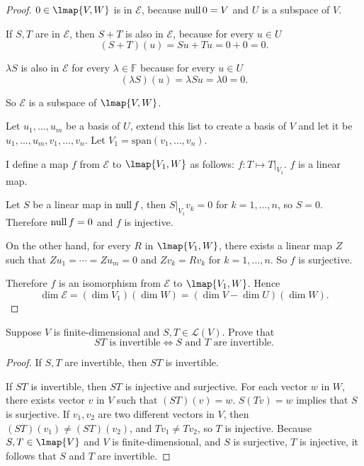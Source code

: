 \begin{proof}
    $0\in \lmap{V, W}$ is in $\mathcal{E}$, because $\text{null}\,{0} = V$ and $U$ is a subspace of $V$.

    If $S, T$ are in $\mathcal{E}$, then $S + T$ is also in $\mathcal{E}$, because for every $u\in U$
    \[
        (S + T)(u) = Su + Tu = 0 + 0 = 0.
    \]

    $\lambda S$ is also in $\mathcal{E}$ for every $\lambda\in\mathbb{F}$ because for every $u\in U$
    \[
        (\lambda S)(u) = \lambda Su = \lambda 0 = 0.
    \]

    So $\mathcal{E}$ is a subspace of $\lmap{V, W}$.

    \bigskip

    Let $u_{1}, \ldots, u_{m}$ be a basis of $U$, extend this list to create a basis of $V$ and let it be $u_{1}, \ldots, u_{m}, v_{1}, \ldots, v_{n}$. Let $V_{1} = \text{span}(v_{1}, \ldots, v_{n})$.

    I define a map $f$ from $\mathcal{E}$ to $\lmap{V_{1}, W}$ as follows: $f: T\mapsto T\vert_{V_{1}}$. $f$ is a linear map.

    Let $S$ be a linear map in $\text{null}\,{f}$, then $S\vert_{V_{1}}v_{k} = 0$ for $k = 1, \ldots, n$, so $S = 0$. Therefore $\text{null}\,{f} = 0$ and $f$ is injective.

    On the other hand, for every $R$ in $\lmap{V_{1}, W}$, there exists a linear map $Z$ such that $Zu_{1} = \cdots = Zu_{m} = 0$ and $Zv_{k} = Rv_{k}$ for $k = 1, \ldots, n$. So $f$ is surjective.

    Therefore $f$ is an isomorphism from $\mathcal{E}$ to $\lmap{V_{1}, W}$. Hence
    \[
        \dim\mathcal{E} = (\dim V_{1})(\dim W) = (\dim V - \dim U)(\dim W).
    \]
\end{proof}
\newpage

\begin{exercise}\label{chapter3:sectionD:exercise11}
    Suppose $V$ is finite-dimensional and $S, T \in \mathcal{L}(V)$. Prove that
    \[
        \text{$ST$ is invertible} \Longleftrightarrow \text{$S$ and $T$ are invertible.}
    \]
\end{exercise}

\begin{proof}
    If $S, T$ are invertible, then $ST$ is invertible.

    If $ST$ is invertible, then $ST$ is injective and surjective. For each vector $w$ in $W$, there exists vector $v$ in $V$ such that $(ST)(v) = w$. $S(Tv) = w$ implies that $S$ is surjective. If $v_{1}, v_{2}$ are two different vectors in $V$, then $(ST)(v_{1})\ne (ST)(v_{2})$, and $Tv_{1}\ne Tv_{2}$, so $T$ is injective. Because $S, T\in\lmap{V}$ and $V$ is finite-dimensional, and $S$ is surjective, $T$ is injective, it follows that $S$ and $T$ are invertible.
\end{proof}
\newpage

